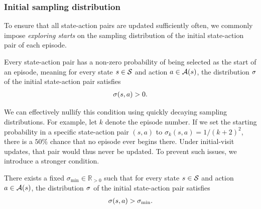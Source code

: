 


\subsubsection{Initial sampling distribution}

To ensure that all state-action pairs are updated sufficiently often,
we commonly impose \textit{exploring starts} on the sampling distribution of the initial state-action pair of each episode.

\begin{definition}
\label{def: exploring starts}
    Every state-action pair has a non-zero probability of being selected as the start of an episode, meaning for every state $s \in \mathcal{S}$ and action $a \in \mathcal{A}(s)$, the distribution $\sigma$ of the initial state-action pair satisfies
    \begin{align*}
        \sigma(s,a) > 0.
    \end{align*}
\end{definition}
\vspace{-0.4cm}

We can effectively nullify this condition using quickly decaying sampling distributions.
For example, let $k$ denote the episode number. If we set the starting probability in a specific state-action pair $(s,a)$ to $\sigma_k(s,a) = 1/(k+2)^2$, there is a $50\%$ chance that no episode ever begins there. Under initial-visit updates, that pair would thus never be updated. To prevent such issues, we introduce a stronger condition.

\begin{definition}
\label{def: strict exploring starts}
    There exists a fixed $\sigma_{\min} \in \mathbb R_{> 0}$ such that
    for every state $s \in \mathcal{S}$ and action $a \in \mathcal{A}(s)$, the distribution $\sigma$ of the initial state-action pair satisfies
    \begin{align*}
        \sigma(s,a) > \sigma_{\min}.
    \end{align*}
\end{definition}

